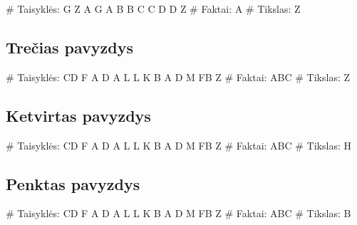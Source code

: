 \begin{pythonaienv}[fc]
# Taisyklės:
G Z
A G
A B
B C
C D
D Z
# Faktai:
A
# Tikslas:
Z
\end{pythonaienv}

\subsection{Trečias pavyzdys}

\begin{pythonaienv}[fc]
# Taisyklės:
CD F
A D
A L
L K
B A
D M
FB Z
# Faktai:
ABC
# Tikslas:
Z
\end{pythonaienv}

\subsection{Ketvirtas pavyzdys}

\begin{pythonaienv}[fc]
# Taisyklės:
CD F
A D
A L
L K
B A
D M
FB Z
# Faktai:
ABC
# Tikslas:
H
\end{pythonaienv}

\subsection{Penktas pavyzdys}

\begin{pythonaienv}[fc]
# Taisyklės:
CD F
A D
A L
L K
B A
D M
FB Z
# Faktai:
ABC
# Tikslas:
B
\end{pythonaienv}
